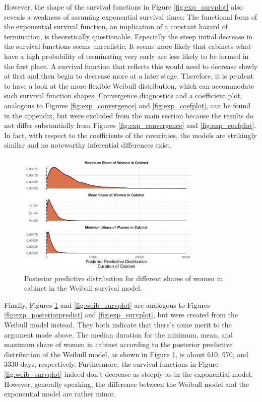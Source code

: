 \documentclass[11pt]{article}
\newcommand\minp[1]{\begin{minipage}{0.8\textwidth} #1 \end{minipage}}
\begin{document}
However, the shape of the survival functions in Figure \ref{fig:exp_survplot} also reveals a weakness of assuming exponential survival times: The functional form of the exponential survival function, an implication of a constant hazard of termination, is theoretically questionable. Especially the steep initial decrease in the survival functions seems unrealistic. It seems more likely that cabinets what have a high probability of terminating very early are less likely to be formed in the first place. A survival function that reflects this would need to decrease slowly at first and then begin to decrease more at a later stage. Therefore, it is prudent to have a look at the more flexible Weibull distribution, which can accommodate such survival function shapes. Convergence diagnostics and a coefficient plot, analogous to Figures \ref{fig:exp_convergence} and \ref{fig:exp_coefplot}, can be found in the appendix, but were excluded from the main section because the results do not differ substantially from Figures \ref{fig:exp_convergence} and \ref{fig:exp_coefplot}. In fact, with respect to the coefficients of the covariates, the models are strikingly similar and no noteworthy inferential differences exist.

\begin{figure}[!ht]
    \centering
    \minp{\caption{Posterior predictive distribution for different shares of women in cabinet in the Weibull survival model.} \label{fig:weib_posteriorpredict}}
    \includegraphics[width = 0.8\textwidth]{figures/fig3_weib_posteriorpredict.pdf}
\end{figure}

Finally, Figures \ref{fig:weib_posteriorpredict} and \ref{fig:weib_survplot} are analogous to Figures \ref{fig:exp_posteriorpredict} and \ref{fig:exp_survplot}, but were created from the Weibull model instead. They both indicate that there's some merit to the argument made above. The median duration for the minimum, mean, and maximum share of women in cabinet according to the posterior predictive distribution of the Weibull model, as shown in Figure \ref{fig:weib_posteriorpredict}, is about 610, 970, and 3330 days, respectively. Furthermore, the survival functions in Figure \ref{fig:weib_survplot} indeed don't decrease as steeply as in the exponential model. However, generally speaking, the difference between the Weibull model and the exponential model are rather minor. 
\end{document}
